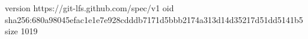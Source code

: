 version https://git-lfs.github.com/spec/v1
oid sha256:680a98045efac1e1e7e928cdddb7171d5bbb2174a313d14d35217d51dd5141b5
size 1019
